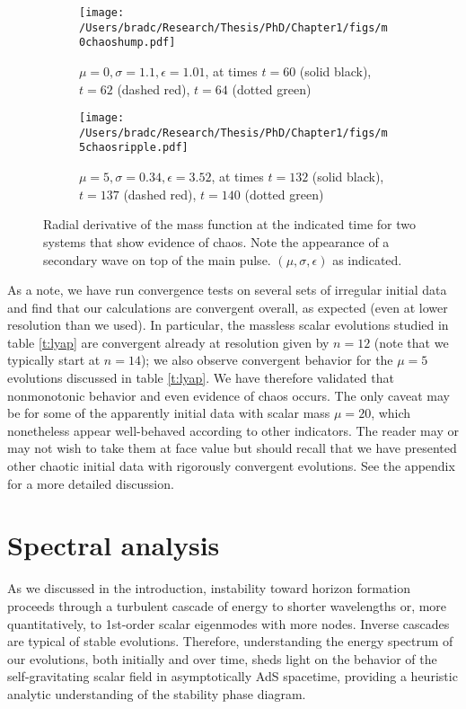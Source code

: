 \documentclass[../PhD.tex]{subfiles}
\begin{document}
\begin{figure}[!t]
\centering
\begin{subfigure}[t]{0.47\textwidth}
\texttt{[image: /Users/bradc/Research/Thesis/PhD/Chapter1/figs/m0chaoshump.pdf]}
\caption{$\mu=0,\sigma=1.1,\epsilon=1.01$, at times $t=60$ (solid black),
$t=62$ (dashed red), $t=64$ (dotted green)}
\label{f:m0hump}
\end{subfigure}
\begin{subfigure}[t]{0.47\textwidth}
\texttt{[image: /Users/bradc/Research/Thesis/PhD/Chapter1/figs/m5chaosripple.pdf]}
\caption{$\mu=5,\sigma=0.34,\epsilon=3.52$, at times $t=132$ (solid black),
$t=137$ (dashed red), $t=140$ (dotted green)}
\label{f:m5ripple}
\end{subfigure}
\caption[Mass density profiles for chaotic systems]{Radial derivative of the mass function at the indicated time
for two systems that show evidence of chaos.  
Note the appearance of a secondary wave on top
of the main pulse. $(\mu,\sigma,\epsilon)$ as indicated.}
\label{f:chaosmechanism}
\end{figure}

As a note, we have run convergence tests on several sets of irregular
initial data and find that our calculations are convergent overall, as expected
(even at lower resolution than we used).  In particular, the massless
scalar evolutions studied in table \ref{t:lyap} are convergent already at
resolution given by $n=12$ (note that we typically start at $n=14$); we 
also observe convergent behavior for the $\mu=5$ evolutions discussed
in table \ref{t:lyap}.  We have therefore validated that nonmonotonic 
behavior and even evidence of chaos occurs.
The only caveat may be for some of the apparently initial data with 
scalar mass $\mu=20$, which nonetheless appear well-behaved according to other 
indicators.  The reader may or may not wish to take them at
face value but should recall that we have presented other chaotic initial
data with rigorously convergent evolutions.  See the appendix for a more 
detailed discussion.


\section{Spectral analysis}\label{s:analysis}

As we discussed in the introduction, instability toward horizon formation
proceeds through a turbulent cascade of energy to shorter wavelengths or,
more quantitatively, to 1st-order scalar eigenmodes with more nodes.
Inverse cascades are typical of stable evolutions.
Therefore, understanding the energy spectrum of our evolutions, both initially
and over time, sheds light on the behavior of the self-gravitating scalar
field in asymptotically AdS spacetime, providing a heuristic analytic 
understanding of the stability phase diagram.
\end{document}
